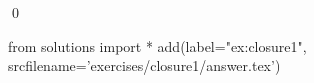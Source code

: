 
\begin{ex} 
  \label{ex:closure1}
  
  \qed
\end{ex} 
\begin{python0}
from solutions import *
add(label="ex:closure1",
    srcfilename='exercises/closure1/answer.tex') 
\end{python0}
